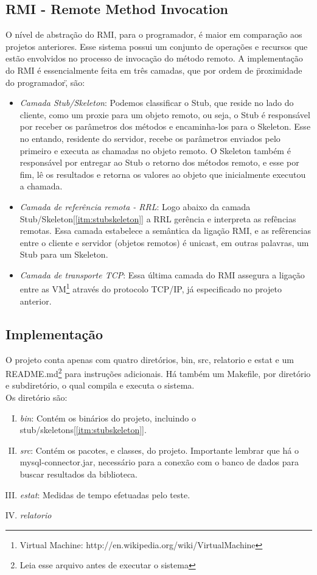 \documentclass[a4paper,10pt]{article}
\begin{document}
\subsection{RMI - Remote Method Invocation}
O nível de abstração do RMI, para o programador, é maior em comparação aos projetos anteriores. Esse sistema possui um conjunto de operações e recursos que 
estão envolvidos no processo de invocação do método remoto. A implementação do RMI é essencialmente feita em três camadas, que por ordem de \"proximidade do programador\", são: 
\begin{itemize}
\item \label{itm:stubskeleton}\emph{Camada Stub/Skeleton}: Podemos classificar o Stub, que reside no lado do cliente, como um proxie para um objeto remoto, ou seja, o Stub é responsável por receber
os parâmetros dos métodos e encaminha-los para o Skeleton.  Esse no entando, residente do servidor, recebe os parâmetros enviados pelo primeiro e executa as chamadas
no objeto remoto. O Skeleton também é responsável por entregar ao Stub o retorno dos métodos remoto, e esse por fim, lê os resultados e retorna os valores ao 
objeto que inicialmente executou a chamada.
\item \emph{Camada de referência remota - RRL}: Logo abaixo da camada Stub/Skeleton[\ref{itm:stubskeleton}] a RRL gerência e interpreta as refências remotas. Essa camada estabelece a semântica da ligação RMI, e as refêrencias entre o cliente e servidor (objetos remotos) é unicast, em outras palavras, um Stub para um Skeleton.
\item \label{itm:tranportetcp} \emph{Camada de transporte TCP}: Essa última camada do RMI assegura a ligação entre as VM\footnote{Virtual Machine: http://en.wikipedia.org/wiki/VirtualMachine} através do protocolo TCP/IP, já especificado no projeto anterior. 
\end{itemize}
\subsection{Implementação}
O projeto conta apenas com quatro diretórios, bin, src, relatorio e estat e um README.md\footnote{Leia esse arquivo antes de
executar o sistema} para instruções adicionais. Há também um Makefile, por diretório e subdiretório, o qual 
compila e executa o sistema.
\\Os diretório são:
\begin{enumerate}[I.]
  \label{sec:dirs}
\item \label{itm:bin} \emph{bin}: Contém os binários do projeto, incluindo o stub/skeletons[\ref{itm:stubskeleton}].
\item \label{itm:src} \emph{src}: Contém os pacotes, e classes, do projeto. Importante lembrar que há o mysql-connector.jar, necessário
  para a conexão com o banco de dados para buscar resultados da biblioteca.
\item \label{itm:estat} \emph{estat}: Medidas de tempo efetuadas pelo teste.
\item \label{itm:relatorio} \emph{relatorio}
\end{enumerate}
\end{document}
